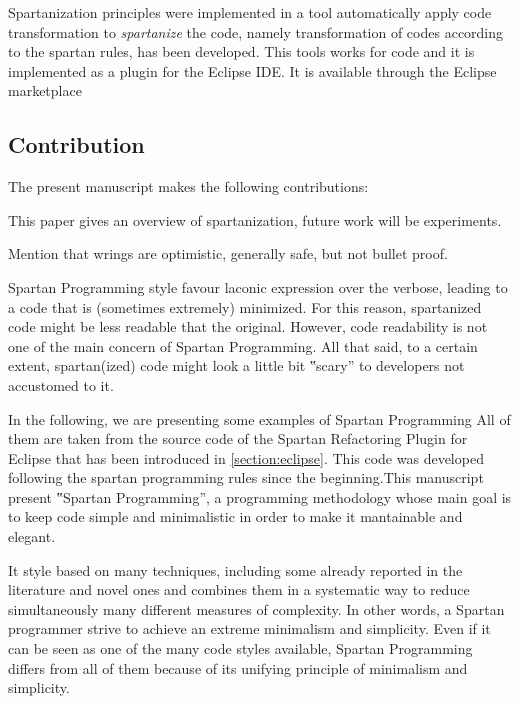 Spartanization principles were implemented in a tool automatically apply code
transformation to \emph{spartanize} the code, namely transformation of codes
according to the spartan rules, has been developed.
This tools works for \Java code and it is implemented as a plugin for the
Eclipse IDE\@. It is available through the Eclipse
marketplace



\subsection{Contribution}

The present manuscript makes the following contributions:


This paper gives an overview of spartanization, future work will be
experiments.

Mention that wrings are optimistic, generally safe, but not bullet proof.

Spartan Programming style favour laconic expression over the verbose, leading
to a code that is (sometimes extremely) minimized. For this reason, spartanized
code might be less readable that the original. However, code readability is not
one of the main concern of Spartan Programming. All that said, to a certain
extent, spartan(ized) code might look a little bit ‟scary” to developers not
accustomed to it.

In the following, we are presenting some examples of Spartan
Programming %
All of them are taken from the source code of the Spartan Refactoring Plugin
for Eclipse that has been introduced in \cref{section:eclipse}. This code was
developed following the spartan programming rules since the beginning.This manuscript present ‟Spartan Programming”, a programming methodology
whose main goal is to keep code simple and minimalistic in order to make it
mantainable and elegant.

It style based on many techniques, including some already reported in the literature and novel
ones and combines them in a systematic way to reduce simultaneously many
different measures of complexity. In other words, a Spartan programmer strive
to achieve an extreme minimalism and simplicity. Even if it can be seen as one
of the many code styles available, Spartan Programming differs from all of them
because of its unifying principle of minimalism and simplicity.

